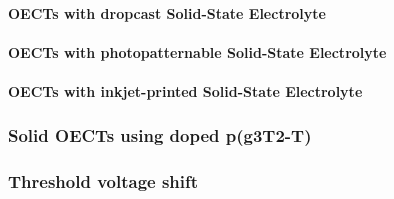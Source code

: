 \paragraph{OECTs with dropcast Solid-State Electrolyte}
\paragraph{OECTs with photopatternable Solid-State Electrolyte}
\paragraph{OECTs with inkjet-printed Solid-State Electrolyte}

\subsubsection{Solid OECTs using doped p(g3T2-T)}

\subsubsection{Threshold voltage shift}





